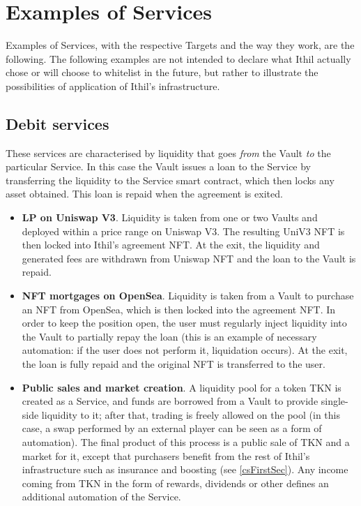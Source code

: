 \documentclass[a4paper,10 pt]{article}
\theoremstyle{definition}
\begin{document}
\section{Examples of Services}\label{servicesSec}

Examples of Services, with the respective Targets and the way they work, are the following. The following examples are not intended to declare what Ithil actually chose or will choose to whitelist in the future, but rather to illustrate the possibilities of application of Ithil's infrastructure.

\subsection{Debit services}
These services are characterised by liquidity that goes {\it from} the Vault {\it to} the particular Service. In this case the Vault issues a loan to the Service by transferring the liquidity to the Service smart contract, which then locks any asset obtained. This loan is repaid when the agreement is exited.

\begin{itemize}
\item {\bf LP on Uniswap V3}. Liquidity is taken from one or two Vaults and deployed within a price range on Uniswap V3. The resulting UniV3 NFT is then locked into Ithil's agreement NFT. At the exit, the liquidity and generated fees are withdrawn from Uniswap NFT and the loan to the Vault is repaid.

\item {\bf NFT mortgages on OpenSea}. Liquidity is taken from a Vault to purchase an NFT from OpenSea, which is then locked into the agreement NFT. In order to keep the position open, the user must regularly inject liquidity into the Vault to partially repay the loan (this is an example of necessary automation: if the user does not perform it, liquidation occurs). At the exit, the loan is fully repaid and the original NFT is transferred to the user.

\item {\bf Public sales and market creation}. A liquidity pool for a token TKN is created as a Service, and funds are borrowed from a Vault to provide single-side liquidity to it; after that, trading is freely allowed on the pool (in this case, a swap performed by an external player can be seen as a form of automation). The final product of this process is a public sale of TKN and a market for it, except that purchasers benefit from the rest of Ithil's infrastructure such as insurance and boosting (see \ref{csFirstSec}). Any income coming from TKN in the form of rewards, dividends or other defines an additional automation of the Service.
\end{itemize}
\end{document}
